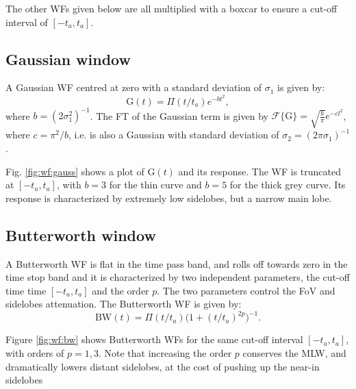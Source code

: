 \documentclass[useAMS,usenatbib]{mn2e}
\begin{document}
The other WFs given below are all multiplied with a boxcar to ensure a cut-off interval of $[-t_a,t_a]$.

\subsection{Gaussian window}


A Gaussian WF centred at zero with a standard deviation of $\sigma_1$ is given by: 
\begin{equation}
\mathrm{G}(t)= \Pi(t/t_a) e^{-bt^{2}}, \label{eq:gauss}
\end{equation}
where $b=(2\sigma_1^2)^{-1}$. The FT of the Gaussian term is given by 
$\mathcal{F}\big\{\mathrm{G}\big\}=\sqrt{\frac{b}{\pi}}e^{-cl^2}$, where $c=\pi^2/b$, i.e.
is also a Gaussian with standard deviation of $\sigma_2= (2\pi\sigma_1)^{-1}$.

Fig. \ref{fig:wf:gauss} shows a plot of $\mathrm{G}(t)$ and its response. 
The WF is truncated at $[-t_a,t_a]$, with $b = 3$ for the thin curve and $b=5$ for the thick grey curve. 
Its response is characterized by extremely low sidelobes, but a narrow main lobe.

\subsection{Butterworth window}


A Butterworth WF is flat in the time pass band, and rolls off towards zero in the time stop band and it is 
characterized by two independent parameters, the cut-off time time $[-t_a,t_a]$ and the order $p$. 
The two parameters control the 
FoV and sidelobes attenuation. The Butterworth WF is given by:
\begin{equation}
\mathrm{BW}(t)= \Pi(t/t_a) \Big(1 + (t/t_a)^{2p}\Big)^{-1}.
\end{equation}

Figure \ref{fig:wf:bw} shows Butterworth WFs for the same cut-off interval $[-t_a,t_a]$, with orders of $p=1,3$. Note that increasing 
the order $p$ conserves the MLW, and dramatically lowers distant sidelobes, at the cost of pushing up the near-in sidelobes
\end{document}
